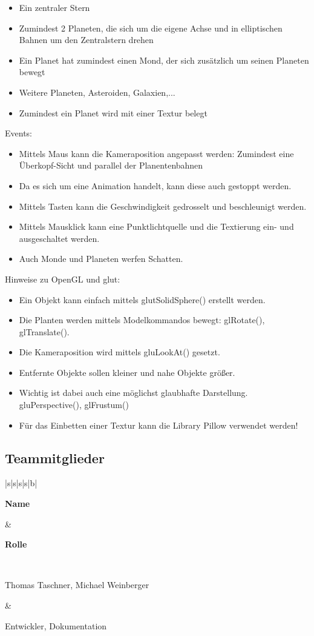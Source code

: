 \documentclass[12pt,a4paper,oneside,ngerman]{scrartcl}
\newcommand{\tabhvent}[1]{\noindent\parbox[c]{\hsize}{#1}}
\begin{document}
\begin{itemize}
\item Ein zentraler Stern
\item Zumindest 2 Planeten, die sich um die eigene Achse und in elliptischen Bahnen um den Zentralstern drehen
\item Ein Planet hat zumindest einen Mond, der sich zusätzlich um seinen Planeten bewegt
\item Weitere Planeten, Asteroiden, Galaxien,...
\item Zumindest ein Planet wird mit einer Textur belegt
\end{itemize}

Events:

\begin{itemize}
\item Mittels Maus kann die Kameraposition angepasst werden: Zumindest eine Überkopf-Sicht und parallel der Planentenbahnen
\item Da es sich um eine Animation handelt, kann diese auch gestoppt werden.
\item Mittels Tasten kann die Geschwindigkeit gedrosselt und beschleunigt werden.
\item Mittels Mausklick kann eine Punktlichtquelle und die Textierung ein- und ausgeschaltet werden.
\item Auch Monde und Planeten werfen Schatten.
\end{itemize}

Hinweise zu OpenGL und glut:

\begin{itemize}
\item Ein Objekt kann einfach mittels glutSolidSphere() erstellt werden.
\item Die Planten werden mittels Modelkommandos bewegt: glRotate(), glTranslate().
\item Die Kameraposition wird mittels gluLookAt() gesetzt.
\item Entfernte Objekte sollen kleiner und nahe Objekte größer.
\item Wichtig ist dabei auch eine möglichst glaubhafte Darstellung. \newline gluPerspective(), glFrustum()
\item Für das Einbetten einer Textur kann die Library Pillow verwendet werden!
\end{itemize}
\newpage
\subsection{Teammitglieder}
\begin{table}[h]
\renewcommand{\arraystretch}{3.0}
\centering
\begin{tabularx}{\textwidth}{|s|s|s|s|b|}
\hline


\tabhvent{\textbf{Name}} &\tabhvent{\textbf{Rolle}}  \\ \hline

\tabhvent{Thomas Taschner, Michael Weinberger} & \tabhvent{Entwickler, Dokumentation} \\ \hline


\end{tabularx}
\end{table}
\end{document}
